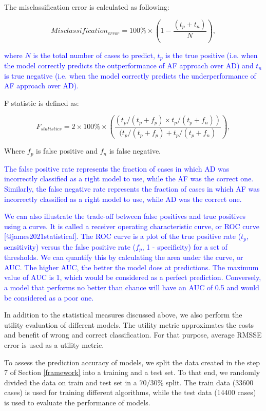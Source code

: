 \documentclass[preprint, 3p,
authoryear]{elsarticle} %
\begin{document}
The misclassification error is calculated as following:

\[Misclassification_{error} = 100\% \times \left( 1-\frac{(t_p+t_n)}{N}\right),\]

\textcolor{blue}{where $N$ is the total number of cases to predict, $t_p$ is the true positive (i.e. when the model correctly predicts the outperformance of AF approach over AD) and $t_n$ is true negative (i.e. when the model correctly predicts the underperformance of AF approach over AD).}

F statistic is defined as:

\[F_{statistics} = 2 \times 100\% \times \left(\frac{(t_p/(t_p+f_p) \times t_p/(t_p+f_n))}{(t_p/(t_p+f_p)+t_p/(t_p+f_n)}\right),\]

Where \(f_p\) is false positive and \(f_n\) is false negative.

\textcolor{blue}{The false positive rate represents the fraction of cases in which AD was incorrectly classified as a right model to use, while the AF was the correct one. Similarly, the false negative rate represents the fraction of cases in which AF was incorrectly classified as a right model to use, while AD was the correct one.}

\textcolor{blue}{We can also illustrate the trade-off between false positives and true positives using a curve. It is called a receiver operating characteristic curve, or ROC curve [@james2021statistical]. The ROC curve is a plot of the true positive rate ($t_p$, sensitivity) versus the false positive rate ($f_p$, 1 - specificity) for a set of thresholds. We can quantify this by calculating the area under the curve, or AUC. The higher AUC, the better the model does at predictions. The maximum value of AUC is 1, which would be considered as a perfect prediction. Conversely, a model that performs no better than chance will have an AUC of 0.5 and would be considered as a poor one.}

In addition to the statistical measures discussed above, we also perform
the utility evaluation of different models. The utility metric
approximates the costs and benefit of wrong and correct classification.
For that purpose, average RMSSE error is used as a utility metric.

To assess the prediction accuracy of models, we split the data created
in the step 7 of Section \ref{framework} into a training and a test set.
To that end, we randomly divided the data on train and test set in a
\(70/30 \%\) split. The train data (33600 cases) is used for training
different algorithms, while the test data (14400 cases) is used to
evaluate the performance of models.
\end{document}
